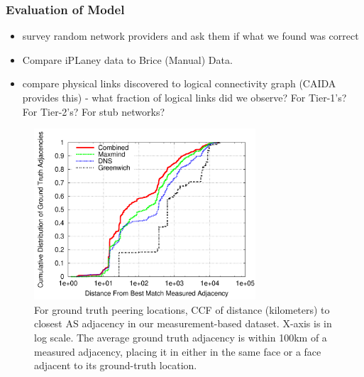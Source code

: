 
        \subsubsection*{Evaluation of Model}
            \begin{itemize}
        \item survey random network providers and ask them if what we
        found was correct
        \item Compare iPLaney data to Brice (Manual) Data.
        \item compare physical links discovered to logical connectivity
        graph (CAIDA provides this) - what fraction of logical links
        did we observe? For Tier-1's? For Tier-2's? For stub networks?
            \end{itemize} 

\begin{figure}[tb]
\centering
\includegraphics[width=3.25in]{graph_all_match}
\caption[]{For ground truth peering locations, CCF of distance (kilometers) to closest AS adjacency in our measurement-based dataset. X-axis is in log scale. The average ground truth adjacency is within 100km of a measured adjacency, placing it in either in the same face or a face adjacent to its ground-truth location.} 
\end{figure}


